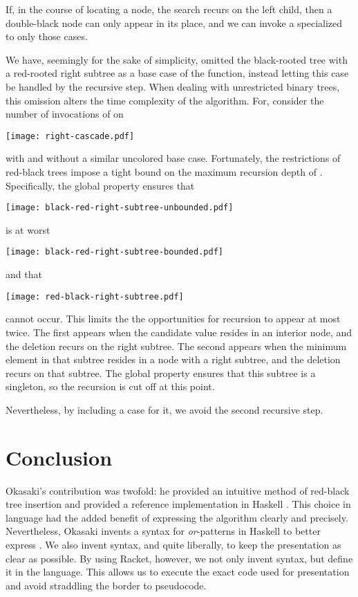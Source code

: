 \documentclass[preprint]{sigplanconf}
\begin{document}
If, in the course of locating a node, the search recurs on the left child, then a double-black node can only appear in its place, and we can invoke a  specialized to only those cases. 

We have, seemingly for the sake of simplicity, omitted the black-rooted tree with a red-rooted right subtree as a base case of the  function, instead letting this case be handled by the recursive step. When dealing with unrestricted binary trees, this omission alters the time complexity of the algorithm. For, consider the number of invocations of  on
\begin{center}
\texttt{[image: right-cascade.pdf]}
\end{center}
with and without a similar uncolored base case. Fortunately, the restrictions of red-black trees impose a tight bound on the maximum recursion depth of . Specifically, the global property ensures that
\begin{center}
\texttt{[image: black-red-right-subtree-unbounded.pdf]}
\end{center}
is at worst
\begin{center}
\texttt{[image: black-red-right-subtree-bounded.pdf]}
\end{center}
and that
\begin{center}
\texttt{[image: red-black-right-subtree.pdf]}
\end{center}
cannot occur. This limits the the opportunities for recursion to appear at most twice. The first appears when the candidate value resides in an interior node, and the deletion recurs on the right subtree. The second appears when the minimum element in that subtree resides in a node with a right subtree, and the deletion recurs on that subtree. The global property ensures that this subtree is a singleton, so the recursion is cut off at this point.

Nevertheless, by including a case for it, we avoid the second recursive step.

\section{Conclusion}

Okasaki's contribution was twofold: he provided an intuitive method of red-black tree insertion and provided a reference implementation in Haskell \cite{hudak1992report}. This choice in language had the added benefit of expressing the algorithm clearly and precisely. Nevertheless, Okasaki invents a syntax for \emph{or}-patterns in Haskell to better express . We also invent syntax, and quite liberally, to keep the presentation as clear as possible. By using Racket, however, we not only invent syntax, but define it in the language. This allows us to execute the exact code used for presentation and avoid straddling the border to pseudocode.
\end{document}
